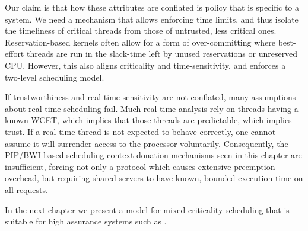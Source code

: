 Our claim is that how these attributes are conflated is
policy that is specific to a system.
We need a mechanism that allows  enforcing time limits, and thus
isolate the timeliness of critical threads from those of untrusted,
less critical ones.
Reservation-based kernels often allow for a form of over-committing where
best-effort threads are run in the slack-time left by unused reservations or unreserved CPU.
However, this also aligns criticality and time-sensitivity, and
enforces a two-level scheduling model.

If trustworthiness and real-time sensitivity are not conflated, many assumptions about real-time
scheduling fail.
Much real-time analysis rely on threads having a known \gls{WCET}, which implies that those threads
are predictable, which implies trust.
If a real-time thread is not expected to behave correctly, one cannot
assume it will surrender access to the processor voluntarily.
Consequently, the \gls{PIP}/\gls{BWI} based scheduling-context donation mechanisms seen in this chapter are
insufficient, forcing not only a protocol which causes extensive preemption overhead, but 
requiring shared servers to have known, bounded execution time on all requests.

In the next chapter we present a model for mixed-criticality scheduling that is suitable for high
assurance systems such as \selfour. 
